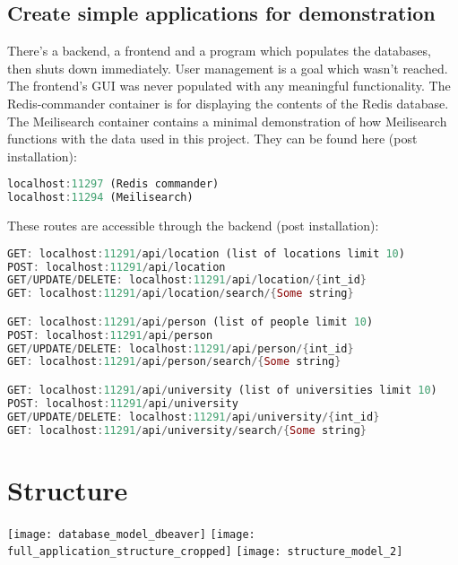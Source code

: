 \documentclass[a4paper, 12pt]{article}
\begin{document}
\subsection{Create simple applications for demonstration}
There's a backend, a frontend and a program which populates the databases, then shuts down immediately. User management is a goal which wasn't reached. The frontend's GUI was never populated with any meaningful functionality. The Redis-commander container is for displaying the contents of the Redis database. The Meilisearch container contains a minimal demonstration of how Meilisearch functions with the data used in this project. They can be found here (post installation):

\begin{lstlisting}[language=Rust]
localhost:11297 (Redis commander)
localhost:11294 (Meilisearch)
\end{lstlisting}

These routes are accessible through the backend (post installation):

\begin{lstlisting}[language=Rust]
GET: localhost:11291/api/location (list of locations limit 10)
POST: localhost:11291/api/location
GET/UPDATE/DELETE: localhost:11291/api/location/{int_id}
GET: localhost:11291/api/location/search/{Some string}

GET: localhost:11291/api/person (list of people limit 10)
POST: localhost:11291/api/person 
GET/UPDATE/DELETE: localhost:11291/api/person/{int_id}
GET: localhost:11291/api/person/search/{Some string}

GET: localhost:11291/api/university (list of universities limit 10)
POST: localhost:11291/api/university 
GET/UPDATE/DELETE: localhost:11291/api/university/{int_id}
GET: localhost:11291/api/university/search/{Some string}
\end{lstlisting}
\section{Structure}
\texttt{[image: database\_model\_dbeaver]}
\texttt{[image: full\_application\_structure\_cropped]}
\texttt{[image: structure\_model\_2]}
\end{document}

